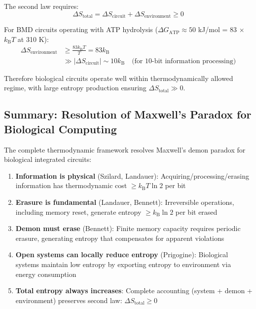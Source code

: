 \documentclass[11pt,a4paper]{article}
\newcommand{\kB}{k_\text{B}}
\begin{document}
The second law requires:
\begin{equation}
\Delta S_{\text{total}} = \Delta S_{\text{circuit}} + \Delta S_{\text{environment}} \geq 0
\end{equation}

For BMD circuits operating with ATP hydrolysis ($\Delta G_{\text{ATP}} \approx 50$ kJ/mol = 83 $\times$ $\kB T$ at 310 K):
\begin{align}
\Delta S_{\text{environment}} &\geq \frac{83 \kB T}{T} = 83 \kB \\
&\gg |\Delta S_{\text{circuit}}| \sim 10 \kB \quad \text{(for 10-bit information processing)}
\end{align}

Therefore biological circuits operate well within thermodynamically allowed regime, with large entropy production ensuring $\Delta S_{\text{total}} \gg 0$.

\subsection{Summary: Resolution of Maxwell's Paradox for Biological Computing}

The complete thermodynamic framework resolves Maxwell's demon paradox for biological integrated circuits:

\begin{enumerate}
\item \textbf{Information is physical} (Szilard, Landauer): Acquiring/processing/erasing information has thermodynamic cost $\geq \kB T \ln 2$ per bit

\item \textbf{Erasure is fundamental} (Landauer, Bennett): Irreversible operations, including memory reset, generate entropy $\geq \kB \ln 2$ per bit erased

\item \textbf{Demon must erase} (Bennett): Finite memory capacity requires periodic erasure, generating entropy that compensates for apparent violations

\item \textbf{Open systems can locally reduce entropy} (Prigogine): Biological systems maintain low entropy by exporting entropy to environment via energy consumption

\item \textbf{Total entropy always increases}: Complete accounting (system + demon + environment) preserves second law: $\Delta S_{\text{total}} \geq 0$
\end{enumerate}
\end{document}
